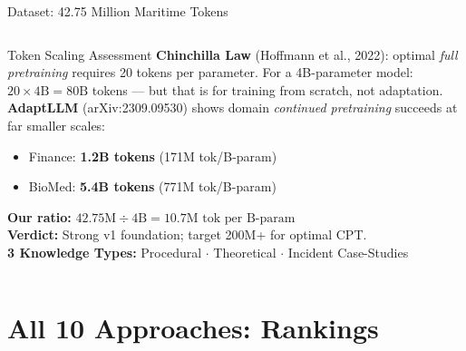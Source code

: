 \documentclass[aspectratio=169,11pt]{beamer}
\begin{document}
\begin{frame}[shrink=15]{Dataset: 42.75 Million Maritime Tokens}
\begin{columns}[T]
\begin{block}{Token Scaling Assessment}
  \scriptsize\RaggedRight
  \textbf{Chinchilla Law} (Hoffmann et al., 2022): optimal \emph{full pretraining}
  requires 20 tokens per parameter. For a 4B-parameter model: $20 \times 4\text{B}
  = 80\text{B}$ tokens --- but that is for training from scratch, not adaptation.\\[3pt]
  \textbf{AdaptLLM} (arXiv:2309.09530) shows domain \emph{continued pretraining}
  succeeds at far smaller scales:
  \begin{itemize}\setlength\itemsep{1pt}
    \item Finance: \textbf{1.2B tokens} (171M tok/B-param)
    \item BioMed: \textbf{5.4B tokens} (771M tok/B-param)
  \end{itemize}
  \textbf{Our ratio:} $42.75\text{M} \div 4\text{B} = 10.7\text{M tok per B-param}$\\[3pt]
  \textbf{Verdict:} Strong v1 foundation; target 200M+ for optimal CPT.\\[3pt]
  \textbf{3 Knowledge Types:}
  Procedural $\cdot$ Theoretical $\cdot$ Incident Case-Studies
\end{block}


\end{columns}
\end{frame}

\section{All 10 Approaches: Rankings}
\end{document}
